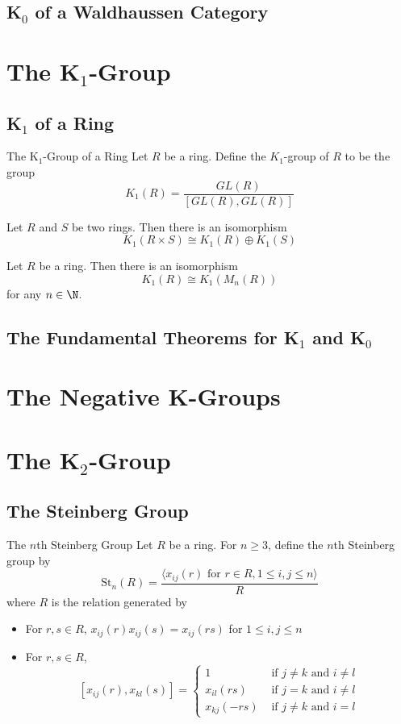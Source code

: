 \documentclass[a4paper]{article}
\begin{document}
\subsection{K${_0}$ of a Waldhaussen Category}

\pagebreak
\section{The K${_1}$-Group}
\subsection{K${_1}$ of a Ring}
\begin{defn}{The K${_1}$-Group of a Ring}{} Let $R$ be a ring. Define the $K_1$-group of $R$ to be the group $$K_1(R)=\frac{GL(R)}{[GL(R),GL(R)]}$$
\end{defn}

\begin{prp}{}{} Let $R$ and $S$ be two rings. Then there is an isomorphism $$K_1(R\times S)\cong K_1(R)\oplus K_1(S)$$
\end{prp}

\begin{prp}{}{} Let $R$ be a ring. Then there is an isomorphism $$K_1(R)\cong K_1(M_n(R))$$ for any $n\in\N$. 
\end{prp}

\subsection{The Fundamental Theorems for K${_1}$ and K${_0}$}

\pagebreak
\section{The Negative K-Groups}

\pagebreak
\section{The K${_2}$-Group}
\subsection{The Steinberg Group}
\begin{defn}{The $n$th Steinberg Group}{} Let $R$ be a ring. For $n\geq 3$, define the $n$th Steinberg group by $$\text{St}_n(R)=\frac{\langle x_{ij}(r)\text{ for }r\in R, 1\leq i,j\leq n\rangle}{R}$$ where $R$ is the relation generated by 
\begin{itemize}
\item For $r,s\in R$, $x_{ij}(r)x_{ij}(s)=x_{ij}(rs)$ for $1\leq i,j\leq n$
\item For $r,s\in R$, $$[x_{ij}(r),x_{kl}(s)]=\begin{cases}
1 & \text{ if } j\neq k\text{ and }i\neq l\\
x_{il}(rs) & \text{ if } j=k \text{ and }i\neq l\\
x_{kj}(-rs) & \text{ if } j\neq k\text{ and }i=l
\end{cases}$$
\end{itemize}
\end{defn}
\end{document}
